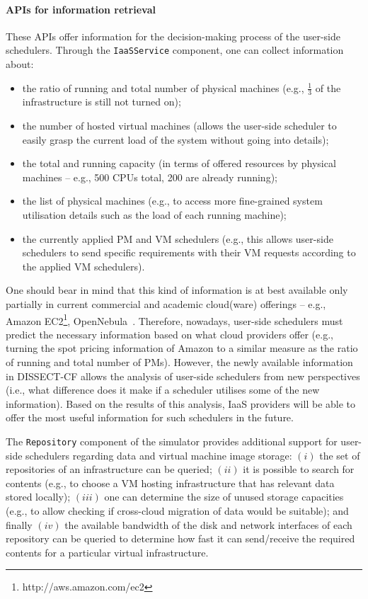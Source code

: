 \documentclass[sort, compress, 5p]{elsarticle}
\begin{document}
\paragraph{APIs for information retrieval} These APIs offer information for the decision-making process of the user-side schedulers. Through the \verb+IaaSService+ component, one can collect information about:
\begin{itemize}
\item the ratio of running and total number of physical machines (e.g., $\frac{1}{3}$ of the infrastructure is still not turned on);
\item the number of hosted virtual machines (allows the user-side scheduler to easily grasp the current load of the system without going into details);
\item the total and running capacity (in terms of offered resources by physical machines -- e.g.,  500 CPUs total, 200 are already running);
\item the list of physical machines (e.g., to access more fine-grained system utilisation details such as the load of each running machine);
\item the currently applied PM and VM schedulers (e.g., this allows user-side schedulers to send specific requirements with their VM requests according to the applied VM schedulers).
\end{itemize}
One should bear in mind that this kind of information is at best available only partially in current commercial and  academic cloud(ware) offerings -- e.g., Amazon EC2\footnote{http://aws.amazon.com/ec2}, OpenNebula~\cite{opennebula2011}. Therefore, nowadays, user-side schedulers must predict the necessary information based on what cloud providers offer (e.g., turning the spot pricing information of Amazon to a similar measure as the ratio of running and total number of PMs). However, the newly available information in DISSECT-CF allows the analysis of user-side schedulers from new perspectives (i.e., what difference does it make if a scheduler utilises some of the new information). Based on the results of this analysis, IaaS providers will be able to offer the most useful information for such schedulers in the future.

The \verb+Repository+ component of the simulator provides additional support for user-side schedulers regarding data and virtual machine image storage: $(i)$ the set of repositories of an infrastructure can be queried; $(ii)$ it is possible to search for contents (e.g., to choose a VM hosting infrastructure that has relevant data stored locally); $(iii)$ one can determine the size of unused storage capacities (e.g., to allow checking if cross-cloud migration of data would be suitable); and finally $(iv)$ the available bandwidth of the disk and network interfaces of each repository can be queried to determine how fast it can send/receive the required contents for a particular virtual infrastructure.
\end{document}
